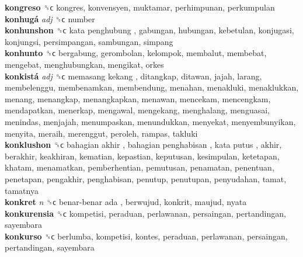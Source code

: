 \textbf{kongreso} ␝ϲ  kongres, konvensyen, muktamar, perhimpunan, perkumpulan  \\
\textbf{konhugá} \emph{adj}  ␝ϲ  number  \\
\textbf{konhunshon} ␝ϲ   kata penghubung , gabungan, hubungan, kebetulan, konjugasi, konjungsi, persimpangan, sambungan, simpang  \\
\textbf{konhunto} ␝ϲ  bergabung, gerombolan, kelompok, membalut, membebat, mengebat, menghubungkan, mengikat, orkes  \\
\textbf{konkistá} \emph{adj}  ␝ϲ   memasang kekang , ditangkap, ditawan, jajah, larang, membelenggu, membenamkan, membendung, menahan, menakluki, menaklukkan, menang, menangkap, menangkapkan, menawan, mencekam, mencengkam, mendapatkan, menerkap, mengawal, mengekang, menghalang, menguasai, menindas, menjajah, menumpaskan, menundukkan, menyekat, menyembunyikan, menyita, meraih, merenggut, peroleh, rampas, takluki  \\
\textbf{konklushon} ␝ϲ   bahagian akhir ,  bahagian penghabisan ,  kata putus , akhir, berakhir, keakhiran, kematian, kepastian, keputusan, kesimpulan, ketetapan, khatam, menamatkan, pemberhentian, pemutusan, penamatan, penentuan, penetapan, pengakhir, penghabisan, penutup, penutupan, penyudahan, tamat, tamatnya  \\
\textbf{konkret} \emph{n}  ␝ϲ   benar-benar ada , berwujud, konkrit, maujud, nyata  \\
\textbf{konkurensia} ␝ϲ  kompetisi, peraduan, perlawanan, persaingan, pertandingan, sayembara  \\
\textbf{konkurso} ␝ϲ  berlumba, kompetisi, kontes, peraduan, perlawanan, persaingan, pertandingan, sayembara  \\
